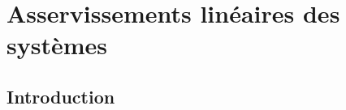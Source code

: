 \chapter{Asservissements linéaires des systèmes\label{chap-asservis}}

\minitoc
\newpage
\section{Introduction}

